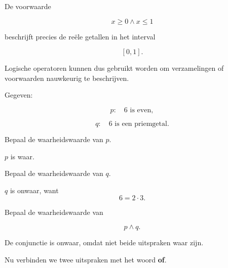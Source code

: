 \documentclass{ximera}
\begin{document}
  \begin{voorbeeld}

  De voorwaarde

  \[
  x\geq0\land x\leq1
  \]

  beschrijft precies de reële getallen in het interval

  \[
  [0,1].
  \]

  Logische operatoren kunnen dus gebruikt worden om verzamelingen
  of voorwaarden nauwkeurig te beschrijven.
  \end{voorbeeld}


  \begin{oefening}[Conjuncties]{\oefB \ESS}

  Gegeven:

  \[
  p:\quad 6\text{ is even},
  \]

  \[
  q:\quad 6\text{ is een priemgetal}.
  \]

  \begin{question}
  Bepaal de waarheidswaarde van $p$.

  \begin{oplossing}
  $p$ is waar.
  \end{oplossing}
  \end{question}

  \begin{question}
  Bepaal de waarheidswaarde van $q$.

  \begin{oplossing}
  $q$ is onwaar, want
  \[
  6=2\cdot3.
  \]
  \end{oplossing}
  \end{question}

  \begin{question}
  Bepaal de waarheidswaarde van

  \[
  p\land q.
  \]

  \begin{oplossing}
  De conjunctie is onwaar, omdat niet beide uitspraken waar zijn.
  \end{oplossing}
  \end{question}

  \end{oefening}



  Nu verbinden we twee uitspraken met het woord \textbf{of}.
\end{document}
